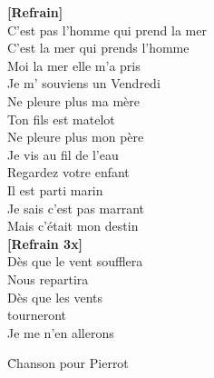 \documentclass{novel}
\begin{document}
\begin{multicols}{3}
\textbf{[Refrain]} \\

C'est pas l'homme qui prend la mer \\
C'est la mer qui prends l'homme \\
Moi la mer elle m'a pris \\
Je m' souviens un Vendredi \\
Ne pleure plus ma mère \\
Ton fils est matelot \\
Ne pleure plus mon père \\
Je vis au fil de l'eau \\
Regardez votre enfant \\
Il est parti marin \\
Je sais c'est pas marrant \\
Mais c'était mon destin \\

\textbf{[Refrain 3x]} \\

Dès que le vent soufflera \\
Nous repartira \\
Dès que les vents \\
tourneront \\
Je me n'en allerons \\
\end{multicols}


\newpage
\small

\h*{Chanson pour Pierrot}
\end{document}
